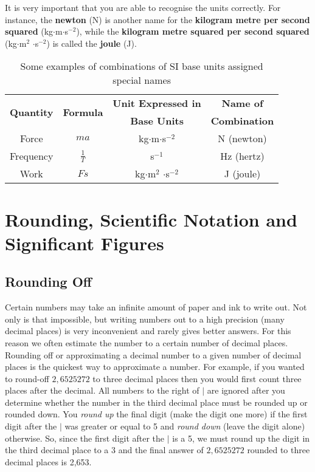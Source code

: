 It is very important that you are able to recognise the units
correctly. For instance, the {\bf newton} (N) is another name for
the {\bf kilogram metre per second squared}
(kg$\cdot$m$\cdot$s$^{-2}$), while the {\bf kilogram metre squared
per second squared} (kg$\cdot$m$^2$ $\cdot$s$^{-2}$) is called the
{\bf joule} (J).

\begin{table}[htbp]
\centering
\begin{tabular}{|c|c|c|c|}\hline
\multirow{2}{*}{\textbf{Quantity}}& \multirow{2}{*}{\textbf{Formula}}&\textbf{Unit Expressed in}&\textbf{Name of}\\
& &\textbf{Base Units}&\textbf{Combination} \\\hline
Force & $ma$ & kg$\cdot$m$\cdot$s$^{-2}$ & N (newton) \\
Frequency & $\frac{1}{T}$ & s$^{-1}$ & Hz (hertz)\\
Work & $Fs$ & kg$\cdot$m$^2$ $\cdot$s$^{-2}$ & J (joule) \\
\hline
\end{tabular}
\caption{Some examples of combinations of SI base units assigned
special names}\label{tab:dim:combos}
\end{table}


\section{Rounding, Scientific Notation and Significant Figures}
\subsection{Rounding Off}
Certain numbers may take an infinite amount of paper and ink to write out. Not only is that impossible, but writing numbers out to a high precision (many decimal places) is very inconvenient and rarely gives better answers. For this reason we often estimate the number to a certain number of decimal places.
Rounding off or approximating a decimal number to a given number of decimal places is the quickest way to approximate a number. For example, if you wanted to round-off $2,6525272$ to three decimal places then you would first count three places after the decimal.
All numbers to the right of $|$ are ignored after you determine whether the number in the third decimal place must be rounded up or rounded down. You \textit{round up} the final digit (make the digit one more) if the first digit after the $|$ was greater or equal to 5 and \textit{round down} (leave the digit alone) otherwise.
So, since the first digit after the $|$ is a 5, we must round up the digit in the third decimal place to a 3 and the final answer of $2,6525272$ rounded to three decimal places is 2,653.

